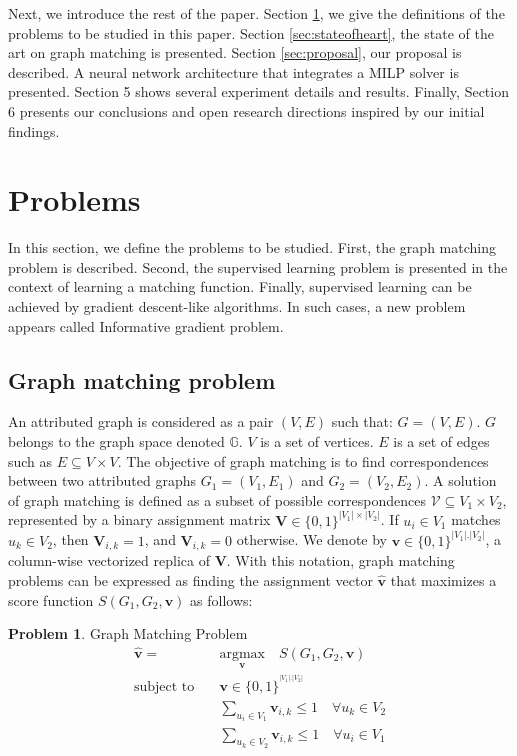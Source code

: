 \documentclass[times,onecolumn,final,authoryear]{article}
\theoremstyle{definition}
\newtheorem{problem}{Problem}
\begin{document}
Next, we introduce the rest of the paper.  Section \ref{sec:problems}, we give the definitions of the problems to be studied in this paper. Section \ref{sec:stateofheart}, the state of the art on graph matching is presented. Section \ref{sec:proposal}, our proposal is described. A neural network architecture that integrates a MILP solver is presented. Section 5 shows several experiment details and results. Finally, Section 6 presents our conclusions and open research directions inspired by our initial findings.


\section{Problems}
\label{sec:problems}
In this section, we define the problems to be studied. First, the graph matching problem is described. Second, the supervised learning problem is presented in the context of learning a matching function. Finally, supervised learning can be achieved by gradient descent-like algorithms. In such cases, a new problem appears called Informative gradient problem.

\subsection{Graph matching problem}
An attributed graph is considered as a pair 
$(V ,E)$ such that: $G = (V ,E)$. $G$ belongs to the graph space denoted $\mathbb{G}$. $V$ is a set of vertices. $E$ is a set of edges such as $E \subseteq V \times V$.
The objective of graph matching is to find correspondences between two attributed graphs $G_1=(V_1,E_1)$ and $G_2=(V_2,E_2)$. A solution of graph matching is defined as a subset of possible correspondences $\mathcal{V} \subseteq V_1 \times V_2$, represented by a binary assignment matrix $ \textbf{V} \in \{0,1 \}^{|V_1| \times |V_2|}$. If $u_i \in V_1$ matches $u_k \in V_2$, then $\textbf{V}_{i,k}=1$, and $\textbf{V}_{i,k}=0$ otherwise. We
denote by $\textbf{v} \in \{0,1 \}^{|V_1| . |V_2|}$, a column-wise vectorized replica of $\textbf{V}$. With this notation, graph matching problems can be expressed as finding the assignment vector $\hat{\textbf{v}}$ that maximizes a score function $S(G_1, G_2,  \textbf{v})$ as follows:
\begin{problem}{Graph Matching Problem}
\label{prob:GM}
\begin{subequations}
  \begin{align}
   \hat{\textbf{v}} =& \underset{\textbf{v}} {\mathrm{argmax}} \quad S(G_1, G_2, \textbf{v})\\
    \text{subject to}\quad & \textbf{v} \in \{0, 1\}^{^{|V_1| . |V_2|}}\\
    \label{eq:subgmgmc}
    &\sum_{u_i \in V_1} \textbf{v}_{i,k} \leq 1 \quad \forall u_k \in V_2\\
    \label{eq:subgmgmd}
     &\sum_{u_k \in V_2} \textbf{v}_{i,k} \leq 1 \quad \forall u_i \in V_1
  \end{align}
\end{subequations}
\end{problem}
\end{document}
